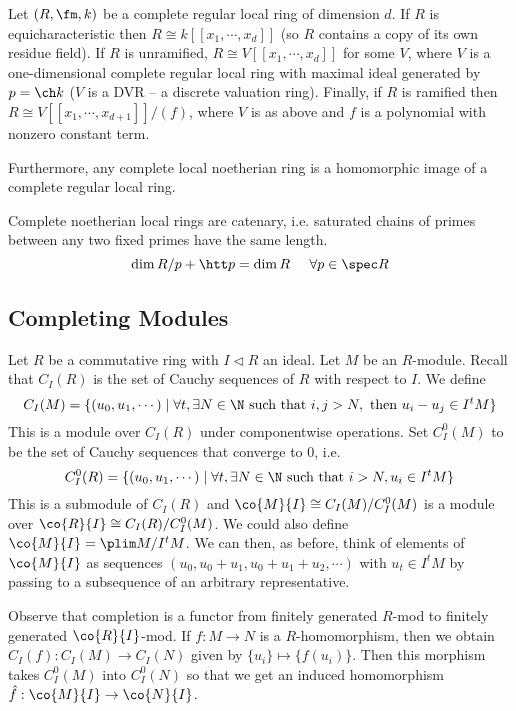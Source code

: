 \begin{thmm}
Let $(R,\fm,k)$ be a complete regular local ring of dimension $d$. If $R$ is equicharacteristic then $R \cong k[[x_1,\cdots,x_d]]$ (so $R$ contains a copy of its own residue field). If $R$ is unramified, $R \cong V[[x_1,\cdots,x_d]]$ for some $V$, where $V$ is a one-dimensional complete regular local ring with maximal ideal generated by $p=\ch k$ ($V$ is a DVR -- a discrete valuation ring). Finally, if $R$ is ramified then $R \cong V[[x_1,\cdots,x_{d+1}]]/(f)$, where $V$ is as above and $f$ is a polynomial with nonzero constant term. 

Furthermore, any complete local noetherian ring is a homomorphic image of a complete regular local ring. 
\end{thmm}

\begin{cor}
Complete noetherian local rings are catenary, i.e. saturated chains of primes between any two fixed primes have the same length. 
\[
\dim R/p + \htt p= \dim R \;\;\;\;\; \forall p \in \spec R
\]
\end{cor}

\subsection{Completing Modules}

Let $R$ be a commutative ring with $I \lhd R$ an ideal. Let $M$ be an $R$-module. Recall that $C_I(R)$ is the set of Cauchy sequences of $R$ with respect to $I$. We define
\[
C_I(M)=\{(u_0,u_1,\cdots)\;|\; \forall t, \exists N \in \N \text{ such that } i,j>N, \text{ then }u_i-u_j \in I^tM\}
\]
This is a module over $C_I(R)$ under componentwise operations. Set $C_I^0(M)$ to be the set of Cauchy sequences that converge to 0, i.e.
\[
C_I^0(R)=\{(u_0,u_1,\cdots) \;|\; \forall t, \exists N \in \N \text{ such that }i>N, u_i \in I^tM\}
\]
This is a submodule of $C_I(R)$ and $\co{M}{I} \cong C_I(M)/C_I^0(M)$ is a module over $\co{R}{I} \cong C_I(R)/C_I^0(M)$. We could also define $\co{M}{I}= \plim M/I^tM$. We can then, as before, think of elements of $\co{M}{I}$ as sequences $(u_0,u_0+u_1,u_0+u_1+u_2,\cdots)$ with $u_t \in I^tM$ by passing to a subsequence of an arbitrary representative. 

Observe that completion is a functor from finitely generated $R$-mod to finitely generated $\co{R}{I}$-mod. If $f: M \to N$ is a $R$-homomorphism, then we obtain $C_I(f): C_I(M) \to C_I(N)$ given by $\{u_i\} \mapsto \{f(u_i)\}$. Then this morphism takes $C_I^0(M)$ into $C_I^0(N)$ so that we get an induced homomorphism $\hat{f}: \co{M}{I} \to \co{N}{I}$. 

